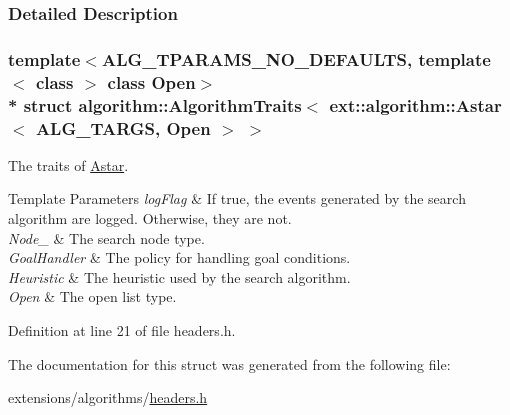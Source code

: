 \subsubsection{Detailed Description}
\subsubsection*{template$<$A\+L\+G\+\_\+\+T\+P\+A\+R\+A\+M\+S\+\_\+\+N\+O\+\_\+\+D\+E\+F\+A\+U\+L\+TS, template$<$ class $>$ class Open$>$\\*
struct algorithm\+::\+Algorithm\+Traits$<$ ext\+::algorithm\+::\+Astar$<$ A\+L\+G\+\_\+\+T\+A\+R\+G\+S, Open $>$ $>$}

The traits of \hyperlink{structAstar}{Astar}. 


\begin{DoxyTemplParams}{Template Parameters}
{\em log\+Flag} & If {\ttfamily true}, the events generated by the search algorithm are logged. Otherwise, they are not. \\
\hline
{\em Node\+\_\+} & The search node type. \\
\hline
{\em Goal\+Handler} & The policy for handling goal conditions. \\
\hline
{\em Heuristic} & The heuristic used by the search algorithm. \\
\hline
{\em Open} & The open list type. \\
\hline
\end{DoxyTemplParams}


Definition at line 21 of file headers.\+h.



The documentation for this struct was generated from the following file\+:\begin{DoxyCompactItemize}
\item 
extensions/algorithms/\hyperlink{extensions_2algorithms_2headers_8h}{headers.\+h}\end{DoxyCompactItemize}
